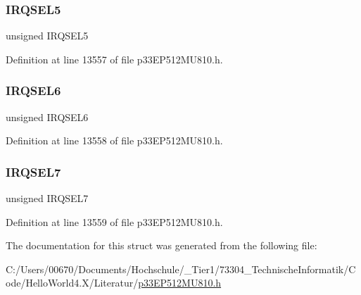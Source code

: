 \subsubsection{\texorpdfstring{I\+R\+Q\+S\+E\+L5}{IRQSEL5}}
{\footnotesize\ttfamily unsigned I\+R\+Q\+S\+E\+L5}



Definition at line 13557 of file p33\+E\+P512\+M\+U810.\+h.

\mbox{\label{structtag_d_m_a12_r_e_q_b_i_t_s_ace52408ef8c29561f3c56a3fbcbc8217}} 
\subsubsection{\texorpdfstring{I\+R\+Q\+S\+E\+L6}{IRQSEL6}}
{\footnotesize\ttfamily unsigned I\+R\+Q\+S\+E\+L6}



Definition at line 13558 of file p33\+E\+P512\+M\+U810.\+h.

\mbox{\label{structtag_d_m_a12_r_e_q_b_i_t_s_acce7dedecdf1f53cdbead3edf7c5d53a}} 
\subsubsection{\texorpdfstring{I\+R\+Q\+S\+E\+L7}{IRQSEL7}}
{\footnotesize\ttfamily unsigned I\+R\+Q\+S\+E\+L7}



Definition at line 13559 of file p33\+E\+P512\+M\+U810.\+h.



The documentation for this struct was generated from the following file\+:\begin{DoxyCompactItemize}
\item 
C\+:/\+Users/00670/\+Documents/\+Hochschule/\+\_\+\+Tier1/73304\+\_\+\+Technische\+Informatik/\+Code/\+Hello\+World4.\+X/\+Literatur/\hyperlink{p33_e_p512_m_u810_8h}{p33\+E\+P512\+M\+U810.\+h}\end{DoxyCompactItemize}

